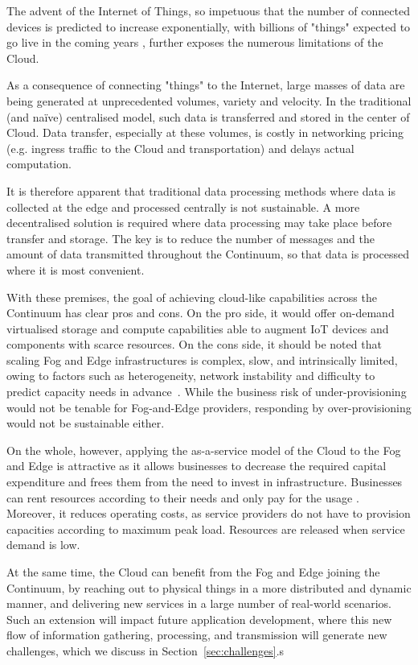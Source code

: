 The advent of the Internet of Things, so impetuous that the number of connected devices is predicted to increase exponentially, with billions of "things" expected to go live in the coming years \cite{gartner-iot}, further exposes the numerous limitations of the Cloud. 

As a consequence of connecting "things" to the Internet, large masses of data are being generated at unprecedented volumes, variety and velocity. 
In the traditional (and na\"ive) centralised model, such data is transferred and stored in the center of Cloud.
Data transfer, especially at these volumes, is costly in networking pricing (e.g. ingress traffic to the Cloud and transportation) and delays actual computation.

It is therefore apparent that traditional data processing methods where data is collected at the edge and processed centrally is not sustainable. 
A more decentralised solution is required where data processing may take place before transfer and storage. The key is to reduce the number of messages and the amount of data transmitted throughout the Continuum, so that data is processed where it is most convenient.

With these premises, the goal of achieving cloud-like capabilities across the Continuum has clear pros and cons. 
On the pro side, it would offer on-demand virtualised storage and compute capabilities able to augment IoT devices and components with scarce resources. 
On the cons side, it should be noted that scaling Fog and Edge infrastructures is complex, slow, and intrinsically limited, owing to factors such as heterogeneity, network instability and difficulty to predict capacity needs in advance~\cite{nygren2010akamai}. 
While the business risk of under-provisioning would not be tenable for Fog-and-Edge providers, responding by over-provisioning would not be sustainable either. 

On the whole, however, applying the as-a-service model of the Cloud to the Fog and Edge is attractive as it allows businesses to decrease the required capital expenditure and frees them from the need to invest in infrastructure. Businesses can rent resources according to their needs and only pay for the usage \cite{botta2016integration}. Moreover, it reduces operating costs, as service providers do not have to provision capacities according to maximum peak load. Resources are released when service demand is low.

At the same time, the Cloud can benefit from the Fog and Edge joining the Continuum, by reaching out to physical things in a more distributed and dynamic manner, and delivering new services in a large number of real-world scenarios. 
Such an extension will impact future application development, where this new flow of information gathering, processing, and transmission will generate new challenges, which we discuss in Section~\ref{sec:challenges}.s

